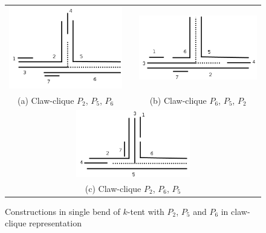  \begin{figure}[htb]
 
  \centering
  \begin{tabular}{  c p{0.7cm} c}
    \includegraphics[width=5cm]{img/noClaw256.png} & &
    \includegraphics[width=5.2cm]{img/noClaw652.png}
    \\
    \footnotesize %
    (a)  \footnotesize Claw-clique $P_2$, $P_5$, $P_6$ && \footnotesize (b) Claw-clique $P_6$, $P_5$, $P_2$\\
    \multicolumn{3}{c}{\includegraphics[width=5cm]{img/noClaw265.png}  }
    \\
    \multicolumn{3}{c}{ \footnotesize (c) Claw-clique $P_2$, $P_6$, $P_5$ }
    \\
  \end{tabular}
 
 \caption{Constructions in single bend of $k$-tent with $P_2$, $P_5$ and $P_6$ in claw-clique representation }
\label{fig:noClaw256}
\end{figure}  
 